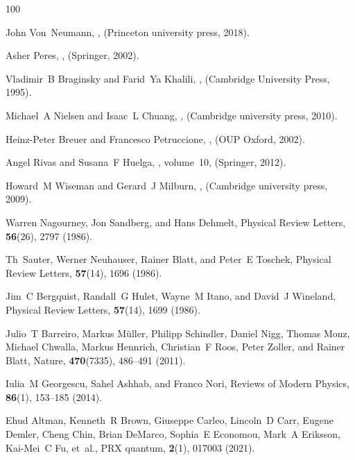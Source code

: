 \documentclass[preprint,pteplogo]{ptephy_v2}%
\numberwithin{equation}{section}
\theoremstyle{definition}
\begin{document}

%
\begin{thebibliography}{100}

John Von~Neumann,
,
\newblock  (Princeton university press, 2018).

Asher Peres,
,
\newblock  (Springer, 2002).

Vladimir~B Braginsky and Farid~Ya Khalili,
,
\newblock  (Cambridge University Press, 1995).

Michael~A Nielsen and Isaac~L Chuang,
,
\newblock  (Cambridge university press, 2010).

Heinz-Peter Breuer and Francesco Petruccione,
,
\newblock  (OUP Oxford, 2002).

Angel Rivas and Susana~F Huelga,
, volume~10,
\newblock  (Springer, 2012).

Howard~M Wiseman and Gerard~J Milburn,
,
\newblock  (Cambridge university press, 2009).

Warren Nagourney, Jon Sandberg, and Hans Dehmelt, Physical Review Letters, {\bf 56}(26), 2797 (1986).

Th~Sauter, Werner Neuhauser, Rainer Blatt, and Peter~E Toschek, Physical Review Letters, {\bf 57}(14), 1696 (1986).

Jim~C Bergquist, Randall~G Hulet, Wayne~M Itano, and David~J Wineland, Physical Review Letters, {\bf 57}(14), 1699 (1986).

Julio~T Barreiro, Markus M{\"u}ller, Philipp Schindler, Daniel Nigg, Thomas Monz, Michael Chwalla, Markus Hennrich, Christian~F Roos, Peter Zoller, and Rainer Blatt, Nature, {\bf 470}(7335), 486--491 (2011).

Iulia~M Georgescu, Sahel Ashhab, and Franco Nori, Reviews of Modern Physics, {\bf 86}(1), 153--185 (2014).

Ehud Altman, Kenneth~R Brown, Giuseppe Carleo, Lincoln~D Carr, Eugene Demler, Cheng Chin, Brian DeMarco, Sophia~E Economou, Mark~A Eriksson, Kai-Mei~C Fu, et~al., PRX quantum, {\bf 2}(1), 017003 (2021).


\end{thebibliography}
\end{document}

